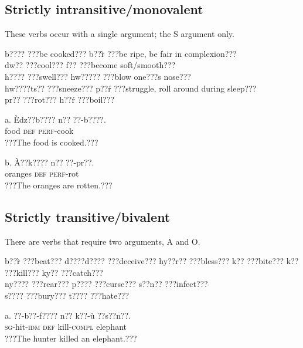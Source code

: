 \documentclass[output=paper]{langsci/langscibook}
\begin{document}
\subsection{Strictly intransitive/monovalent}

These verbs occur with a single argument; the S argument only.


\ea
b????   \textup{???be cooked???}     b??\`{r}   \textup{???be ripe, be fair in complexion???}   \\
dw??   \textup{???cool??? }      f??   \textup{???become soft/smooth???}  \\
h????   \textup{???swell???}     hw?????   \textup{???blow one???s nose???} \\
hw????ts??   \textup{???sneeze???}     p??\'{r}   \textup{???struggle, roll around during sleep???}\\
pr??   \textup{???rot???}       h??\'{r}   \textup{???boil???} \\
\z

\ea
\gll a.  \`{E}dz??b????  n??  ??-b????.\\
       food    \textsc{def}  \textsc{perf}{}-cook\\
\glt   ???The food is cooked.???
\z

\ea
\gll  b.  \`{A}??k????    n??  ??-pr??.\\
       oranges  \textsc{def}  \textsc{perf}{}-rot\\
\glt   ???The oranges are rotten.???
\z

\subsection{Strictly transitive/bivalent}

There are verbs that require two arguments, A and O.

\ea
 b??\`{r}   \textup{???beat???}    d????d????   \textup{???deceive???}  hy??r??   \textup{???bless???}  
 k??     \textup{???bite???}    k??     \textup{???kill???}    ky??   \textup{???catch???}\\

 ny????   \textup{???rear???}    p????     \textup{???curse???}    s??n??   \textup{???infect???}    \\

 s????     \textup{???bury???}    t????     \textup{???hate???}\\
 
 \z
 
 \ea
\gll a.  ??{}-b??-f????  n??  k??-\`{u}     ??s??n??.\\
       \textsc{sg}{}-hit-\textsc{idm}  \textsc{def}  kill-\textsc{compl}  elephant\\
\glt   ???The hunter killed an elephant.???  
\z
\end{document}
